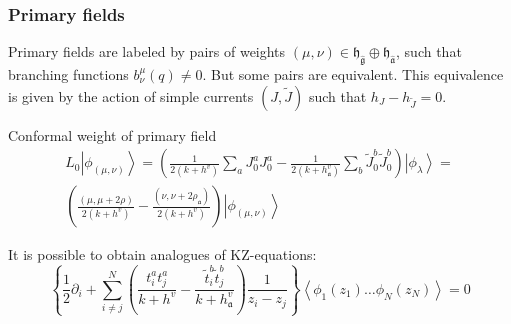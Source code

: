 \documentclass[pdftex]{beamer}
\newcommand{\gf}{\mathfrak{g}}
\newcommand{\gfh}{\hat{\mathfrak{g}}}
\newcommand{\af}{\mathfrak{a}}
\newcommand{\afh}{\hat{\mathfrak{a}}}
\newcommand{\hf}{\mathfrak{h}}
\theoremstyle{definition} \newtheorem{Def}{Definition}
\begin{document}
\begin{frame}
  \frametitle{Primary fields}

  Primary fields are labeled by pairs of weights $(\mu,\nu)\in \hf_{\gfh}\oplus \hf_{\afh}$, such that branching functions $b^{\mu}_{\nu}(q)\neq 0$. But some pairs are equivalent. This equivalence is given by the action of simple currents $(J,\tilde{J})$ such that $h_{J}-h_{\tilde{J}}=0$. 

  Conformal weight of primary field
  \begin{multline}
    L_0\left|\phi_{(\mu,\nu)}\right>=\left(\frac{1}{2(k+h^v)}\sum_aJ^a_0J^a_0-\frac{1}{2(k+h_{\af}^v)}\sum_b \tilde{J}^b_0 \tilde{J}^b_0 \right)
    \left|\phi_{\lambda}\right>=\\
    \left(\frac{(\mu,\mu+2\rho)}{2(k+h^v)}-\frac{(\nu,\nu+2\rho_{\af})}{2(k+h^v)}\right)\left|\phi_{(\mu,\nu)}\right>
  \end{multline}


 It is possible to obtain analogues of KZ-equations:
  \begin{equation*}
    \left\{\frac{1}{2}\partial_{i} + \sum_{i\neq j}^{N}\left(\frac{t^{a}_{i}t^{a}_{j}}{k+h^{v}}-\frac{\tilde t^{b}_{i}\tilde t^{b}_{j}}{k+h^{v}_{\af}}\right)\frac{1}{z_{i}-z_{j}}\right\} \left<\phi_{1}(z_{1})\dots \phi_{N}(z_{N})\right>=0
  \end{equation*}
\end{frame}
\end{document}
